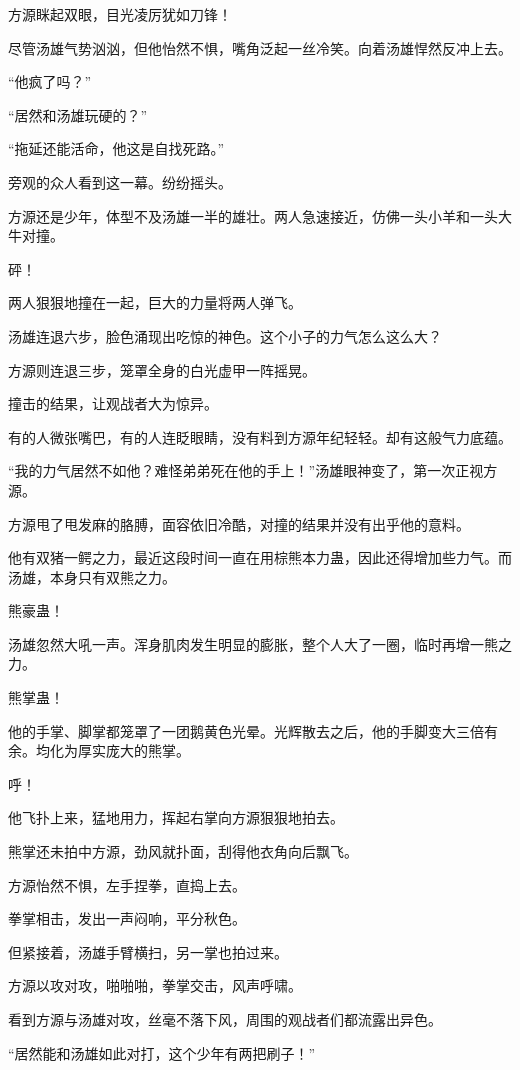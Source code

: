 \begin{this_body}
方源眯起双眼，目光凌厉犹如刀锋！

尽管汤雄气势汹汹，但他怡然不惧，嘴角泛起一丝冷笑。向着汤雄悍然反冲上去。

“他疯了吗？”

“居然和汤雄玩硬的？”

“拖延还能活命，他这是自找死路。”

旁观的众人看到这一幕。纷纷摇头。

方源还是少年，体型不及汤雄一半的雄壮。两人急速接近，仿佛一头小羊和一头大牛对撞。

砰！

两人狠狠地撞在一起，巨大的力量将两人弹飞。

汤雄连退六步，脸色涌现出吃惊的神色。这个小子的力气怎么这么大？

方源则连退三步，笼罩全身的白光虚甲一阵摇晃。

撞击的结果，让观战者大为惊异。

有的人微张嘴巴，有的人连眨眼睛，没有料到方源年纪轻轻。却有这般气力底蕴。

“我的力气居然不如他？难怪弟弟死在他的手上！”汤雄眼神变了，第一次正视方源。

方源甩了甩发麻的胳膊，面容依旧冷酷，对撞的结果并没有出乎他的意料。

他有双猪一鳄之力，最近这段时间一直在用棕熊本力蛊，因此还得增加些力气。而汤雄，本身只有双熊之力。

熊豪蛊！

汤雄忽然大吼一声。浑身肌肉发生明显的膨胀，整个人大了一圈，临时再增一熊之力。

熊掌蛊！

他的手掌、脚掌都笼罩了一团鹅黄色光晕。光辉散去之后，他的手脚变大三倍有余。均化为厚实庞大的熊掌。

呼！

他飞扑上来，猛地用力，挥起右掌向方源狠狠地拍去。

熊掌还未拍中方源，劲风就扑面，刮得他衣角向后飘飞。

方源怡然不惧，左手捏拳，直捣上去。

拳掌相击，发出一声闷响，平分秋色。

但紧接着，汤雄手臂横扫，另一掌也拍过来。

方源以攻对攻，啪啪啪，拳掌交击，风声呼啸。

看到方源与汤雄对攻，丝毫不落下风，周围的观战者们都流露出异色。

“居然能和汤雄如此对打，这个少年有两把刷子！”


\end{this_body}

